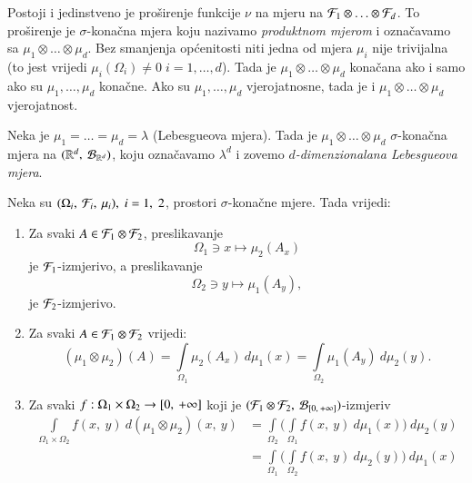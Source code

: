 \begin{tm}  \label{tm:4.12}
    Postoji i jedinstveno je pro\v sirenje funkcije $\nu$ na mjeru na $\mathcal{F}_1 \otimes \ldots \otimes \mathcal{F}_d$.
    To pro\v sirenje je $\sigma$-kona\v cna mjera koju nazivamo \emph{produktnom mjerom} i ozna\v cavamo sa $\mu_1 \otimes \ldots \otimes \mu_d$.
    Bez smanjenja op\' cenitosti niti jedna od mjera $\mu_i$ nije trivijalna (to jest vrijedi $\mu_i (\Omega_i) \neq 0 \; i=1, \dots, d$).
    Tada je $\mu_1 \otimes \ldots \otimes \mu_d$ kona\v cana ako i samo ako su $\mu_1, \ldots, \mu_d$ kona\v cne.
    Ako su $\mu_1, \ldots, \mu_d$ vjerojatnosne, tada je i $\mu_1 \otimes \ldots \otimes \mu_d$ vjerojatnost. 
\end{tm}

\begin{pr}  \label{pr:4.13}
    Neka je $\mu_1 = \ldots = \mu_d = \lambda$ (Lebesgueova mjera).
    Tada je $\mu_1 \otimes \ldots \otimes \mu_d$ $\sigma$-kona\v cna mjera na $({\mathbb{R}^d}, \: {\mathcal{B}_{\mathbb{R}^d}})$, koju ozna\v cavamo $\lambda^d$ i zovemo \emph{$d$-dimenzionalana Lebesgueova mjera}.
\end{pr}

\begin{zad} \label{zad:4.15}
    Neka su $(\Omega_i, \: \mathcal{F}_i, \: \mu_i), \; i = 1, \; 2$, prostori $\sigma$-kona\v cne mjere.
    Tada vrijedi:
    \begin{enumerate}[label=(\roman*)]
        \item   \label{zad:4.15.1}
        Za svaki $A \in \mathcal{F}_1 \otimes \mathcal{F}_2$, preslikavanje
        \begin{equation*}
            \Omega_1 \ni x \mapsto \mu_2 (A_x)
        \end{equation*}
        je $\mathcal{F}_1$-izmjerivo, a preslikavanje
        \begin{equation*}
            \Omega_2 \ni y \mapsto \mu_1 (A_y),
        \end{equation*}
        je $\mathcal{F}_2$-izmjerivo.
        \item   \label{zad:4.15.2}
        Za svaki $A \in \mathcal{F}_1 \otimes \mathcal{F}_2$ vrijedi:
        \begin{equation*}
            (\mu_1 \otimes \mu_2) (A) = \int\limits_{\Omega_1} \mu_2 (A_x) \: d \mu_1(x) = \int\limits_{\Omega_2} \mu_1 (A_y) \: d \mu_2 (y).
        \end{equation*}
        \item   \label{zad:4.15.3}
        Za svaki $f: \Omega_1 \times \Omega_2 \to [{0}, \:{+\infty}]$ koji je $({\mathcal{F}_1 \otimes \mathcal{F}_2}, \: {\mathcal{B}_{[{0}, \:{+\infty}]}})$-izmjeriv
        \begin{align*}
            \int\limits_{\Omega_1 \times \Omega_2} f(x, \: y) \: d (\mu_1 \otimes \mu_2)(x, \:y) &= \int\limits_{\Omega_2} \Big( \int\limits_{\Omega_1} f(x, \: y) \: d \mu_1 (x) \Big) \: d \mu_2 (y)\\
            &= \int\limits_{\Omega_1} \Big( \int\limits_{\Omega_2} f(x, \: y) \: d \mu_2 (y) \Big) \: d \mu_1 (x)
        \end{align*}
    \end{enumerate} 
\end{zad}

